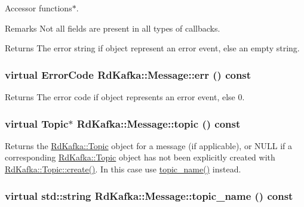 Accessor functions$\ast$. \begin{DoxyRemark}{Remarks}
Not all fields are present in all types of callbacks. 
\end{DoxyRemark}
\begin{DoxyReturn}{Returns}
The error string if object represent an error event, else an empty string. 
\end{DoxyReturn}
\hypertarget{classRdKafka_1_1Message_a90df1fd2a73a74220c9581e6bedb42f2}{
\subsubsection[{err}]{\setlength{\rightskip}{0pt plus 5cm}virtual ErrorCode RdKafka::Message::err () const}}
\label{classRdKafka_1_1Message_a90df1fd2a73a74220c9581e6bedb42f2}
\begin{DoxyReturn}{Returns}
The error code if object represents an error event, else 0. 
\end{DoxyReturn}
\hypertarget{classRdKafka_1_1Message_a6eb88c584037280b796500d541251938}{
\subsubsection[{topic}]{\setlength{\rightskip}{0pt plus 5cm}virtual {\bf Topic}$\ast$ RdKafka::Message::topic () const}}
\label{classRdKafka_1_1Message_a6eb88c584037280b796500d541251938}
\begin{DoxyReturn}{Returns}
the \hyperlink{classRdKafka_1_1Topic}{RdKafka::Topic} object for a message (if applicable), or NULL if a corresponding \hyperlink{classRdKafka_1_1Topic}{RdKafka::Topic} object has not been explicitly created with \hyperlink{classRdKafka_1_1Topic_a01b26449715177b98a3f7edaf42d75a7}{RdKafka::Topic::create()}. In this case use \hyperlink{classRdKafka_1_1Message_a02e16f76e8d248fe47e0f09ff2d13492}{topic\_\-name()} instead. 
\end{DoxyReturn}
\hypertarget{classRdKafka_1_1Message_a02e16f76e8d248fe47e0f09ff2d13492}{
\subsubsection[{topic\_\-name}]{\setlength{\rightskip}{0pt plus 5cm}virtual std::string RdKafka::Message::topic\_\-name () const}}
